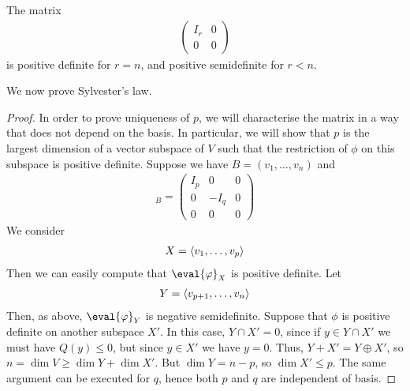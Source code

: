 \begin{example}
	The matrix
	\begin{align*}
		\begin{pmatrix}
			I_r & 0 \\
			0   & 0
		\end{pmatrix}
	\end{align*}
	is positive definite for $r = n$, and positive semidefinite for $r < n$.
\end{example}
\noindent We now prove Sylvester's law.
\begin{proof}
	In order to prove uniqueness of $p$, we will characterise the matrix in a way that does not depend on the basis.
	In particular, we will show that $p$ is the largest dimension of a vector subspace of $V$ such that the restriction of $\phi$ on this subspace is positive definite.
	Suppose we have $B = (v_1, \dots, v_n)$ and
	\begin{align*}
		[\phi]_B = \begin{pmatrix}
			I_p & 0    & 0 \\
			0   & -I_q & 0 \\
			0   & 0    & 0
		\end{pmatrix}
	\end{align*}
	We consider
	\begin{align*}
		X = \langle{} v_1, \dots, v_p \rangle
	\end{align*}
	Then we can easily compute that $\eval{\phi}_X$ is positive definite.
	Let
	\begin{align*}
		Y = \langle{} v_{p+1}, \dots, v_n \rangle
	\end{align*}
	Then, as above, $\eval{\phi}_Y$ is negative semidefinite.
	Suppose that $\phi$ is positive definite on another subspace $X'$.
	In this case, $Y \cap X' = \qty{0}$, since if $y \in Y \cap X'$ we must have $Q(y) \leq 0$, but since $y \in X'$ we have $y = 0$.
	Thus, $Y + X' = Y \oplus X'$, so $n = \dim V \geq \dim Y + \dim X'$.
	But $\dim Y = n - p$, so $\dim X' \leq p$.
	The same argument can be executed for $q$, hence both $p$ and $q$ are independent of basis.
\end{proof}

